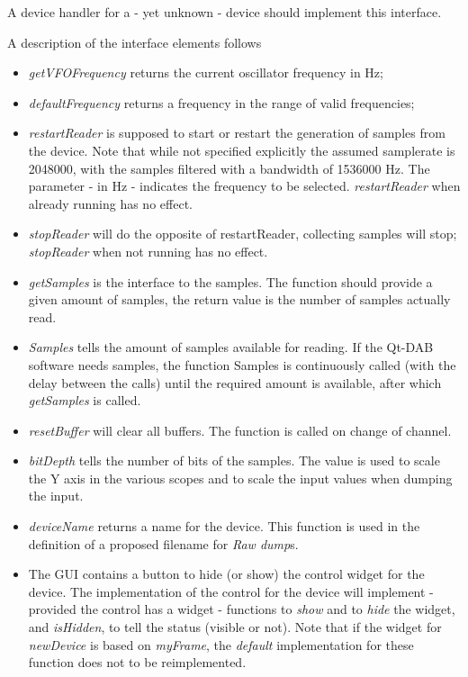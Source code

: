 \documentclass[12pt]{article}
\begin{document}
A device handler for a - yet unknown - device should implement this
interface.
\par
A description of the interface elements follows
\begin{itemize}
\item {\em getVFOFrequency} returns the current oscillator frequency in Hz;
\item {\em defaultFrequency} returns a frequency in the range
of valid frequencies;
\item {\em restartReader} is supposed to start or restart the generation of
samples from the device. Note that while not specified explicitly
the assumed samplerate is 2048000, with  the samples filtered
with a bandwidth of 1536000 Hz.
The parameter - in Hz - indicates the frequency to be selected.
{\em restartReader} when already running has no effect.
\item {\em stopReader} will do the opposite of restartReader, collecting samples
will stop; {\em stopReader} when not running has no effect.
\item {\em getSamples} is the interface to the samples. The function should
provide a given amount of samples, the return value is the number of
samples actually read.
\item {\em Samples} tells the amount of samples available for reading. If the
Qt-DAB software needs samples, the function Samples is continuously called
(with the delay between the calls) until the required amount is available,
after which {\em getSamples} is called.
\item {\em resetBuffer} will clear all buffers. The function is called on change
of channel.
\item {\em bitDepth} tells the number of bits of the samples. The value is
used to scale the Y axis in the various scopes and to scale the input
values when dumping the input. 
\item {\em deviceName} returns a name for the device. This function is
used in the definition of a proposed filename for {\em Raw dump}s.
\item The GUI contains a button to hide (or show) the control widget for
the device. The implementation of the control for the device will
implement - provided the control has a widget - functions to {\em show}
and to {\em hide} the widget, and {\em isHidden}, to tell
the status (visible or not). Note that if the widget for {\em newDevice}
is based on {\em myFrame}, the {\em default} implementation for 
these function does not to be reimplemented.
\end{itemize}
\end{document}
